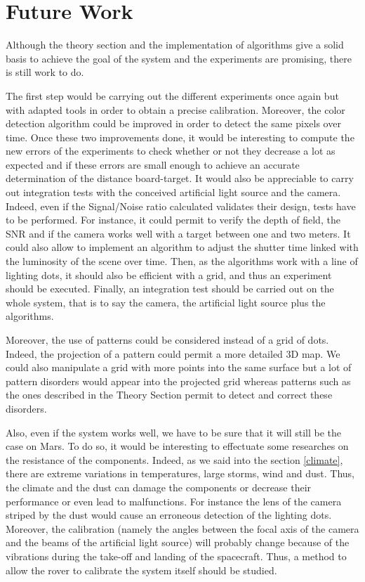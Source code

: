 \chapter*{Future Work}

Although the theory section and the implementation of algorithms give a solid basis to achieve the goal of the system and the experiments are promising, there is still work to do.

The first step would be carrying out the different experiments once again but with adapted tools in order to obtain a precise calibration. Moreover, the color detection algorithm could be improved in order to detect the same pixels over time. Once these two improvements done, it would be interesting to compute the new errors of the experiments to check whether or not they decrease a lot as expected and if these errors are small enough to achieve an accurate determination of the distance board-target. It would also be appreciable to carry out integration tests with the conceived artificial light source and the camera. Indeed, even if the Signal/Noise ratio calculated validates their design, tests have to be performed. For instance, it could permit to verify the depth of field, the SNR and if the camera works well with a target between one and two meters. It could also allow to implement an algorithm to adjust the shutter time linked with the luminosity of the scene over time. Then, as the algorithms work with a line of lighting dots, it should also be efficient with a grid, and thus an experiment should be executed. Finally, an integration test should be carried out on the whole system, that is to say the camera, the artificial light source plus the algorithms.

Moreover, the use of patterns could be considered instead of a grid of dots. Indeed, the projection of a pattern could permit a more detailed 3D map. We could also manipulate a grid with more points into the same surface but a lot of pattern disorders would appear into the projected grid whereas patterns such as the ones described in the Theory Section permit to detect and correct these disorders.

Also, even if the system works well, we have to be sure that it will still be the case on Mars. To do so, it would be interesting to effectuate some researches on the resistance of the components. Indeed, as we said into the section \ref{climate}, there are extreme variations in temperatures, large storms, wind and dust. Thus, the climate and the dust can damage the components or decrease their performance or even lead to malfunctions. For instance the lens of the camera striped by the dust would cause an erroneous detection of the lighting dots. Moreover, the calibration (namely the angles between the focal axis of the camera and the beams of the artificial light source) will probably change because of the vibrations during the take-off and landing of the spacecraft. Thus, a method to allow the rover to calibrate the system itself should be studied.

